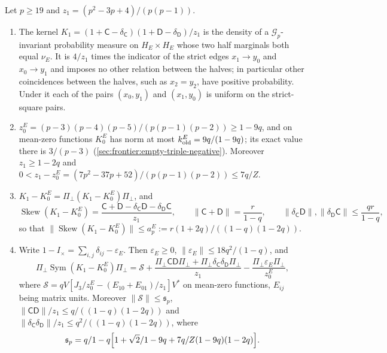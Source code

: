 \begin{lemma}\label{lem:record:e-law}
Let $p\ge19$ and $z_1=(p^2-3p+4)/(p(p-1))$.
\begin{enumerate}[label=(\alph*)]
\item The kernel
 $K_1=(1+\mathsf C-\delta_{\mathsf C})(1+\mathsf D-\delta_{\mathsf D})/z_1$ is the
 density of a $\mathcal G_p$-invariant probability measure on $H_E\times H_E$ whose
 two half marginals both equal $\nu_E$. It is $4/z_1$ times the indicator of the
 strict edges $x_1\to y_0$ and $x_0\to y_1$ and imposes no other relation between
 the halves; in particular other coincidences between the halves, such as
 $x_2=y_2$, have positive probability. Under it each of the pairs $(x_0,y_1)$ and
 $(x_1,y_0)$ is uniform on the strict-square pairs.
\item $z^E_0=(p-3)(p-4)(p-5)/(p(p-1)(p-2))\ge1-9q$, and on mean-zero functions
 $K^E_0$ has norm at most $k^E_{\rm old}=9q/(1-9q)$; its exact value there is
 $3/(p-3)$ (\cref{sec:frontier:empty-triple-negative}). Moreover $z_1\ge1-2q$ and
 $0<z_1-z^E_0=(7p^2-37p+52)/(p(p-1)(p-2))\le7q/Z$.
\item $K_1-K^E_0=\Pi_\perp(K_1-K^E_0)\Pi_\perp$, and
 \[
  \operatorname{Skew}(K_1-K^E_0)=\frac{\mathsf C+\mathsf D-\delta_{\mathsf C}\mathsf D
  -\delta_{\mathsf D}\mathsf C}{z_1},\qquad
  \|\mathsf C+\mathsf D\|=\frac r{1-q},\qquad
  \|\delta_{\mathsf C}\mathsf D\|,\|\delta_{\mathsf D}\mathsf C\|\le\frac{qr}{1-q},
 \]
 so that $\|\operatorname{Skew}(K_1-K^E_0)\|\le a^E_p:=r(1+2q)/((1-q)(1-2q))$.
\item Write $1-I_\times=\sum_{i,j}\delta_{ij}-\varepsilon_E$. Then $\varepsilon_E\ge0$,
 $\|\varepsilon_E\|\le18q^2/(1-q)$, and
 \[
  \Pi_\perp\operatorname{Sym}(K_1-K^E_0)\Pi_\perp
  =\mathcal S+\frac{\Pi_\perp\mathsf C\mathsf D\Pi_\perp
  +\Pi_\perp\delta_{\mathsf C}\delta_{\mathsf D}\Pi_\perp}{z_1}
  -\frac{\Pi_\perp\varepsilon_E\Pi_\perp}{z^E_0},
 \]
 where $\mathcal S=qV[J_3/z^E_0-(E_{10}+E_{01})/z_1]V^*$ on mean-zero functions,
 $E_{ij}$ being matrix units. Moreover $\|\mathcal S\|\le\mathfrak s_p$,
 $\|\mathsf C\mathsf D\|/z_1\le q/((1-q)(1-2q))$ and
 $\|\delta_{\mathsf C}\delta_{\mathsf D}\|/z_1\le q^2/((1-q)(1-2q))$, where
 \[
  \mathfrak s_p=\frac q{1-q}\Bigl[\frac{1+\sqrt2}{1-9q}
  +\frac{7q}{Z(1-9q)(1-2q)}\Bigr].
 \]
\end{enumerate}
\end{lemma}

